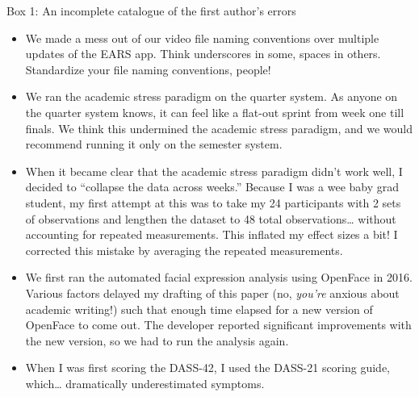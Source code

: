 \documentclass[authordate, empirical,issue]{jote-new-article}
\begin{document}
\begin{table}[b!]
  \begin{adjustwidth}{-4cm}{}
    \vspace*{.5\baselineskip}

    \begin{joteBox}{
        Box 1: An incomplete catalogue of the first author's errors%
      }

      \renewcommand{\baselinestretch}{1.5}
      \small
      \begin{itemize}



        \item    We made a mess out of our video file naming conventions over multiple updates of the EARS app. Think underscores in some, spaces in others. Standardize your file naming conventions, people!



        \item    We ran the academic stress paradigm on the quarter system. As anyone on the quarter system knows, it can feel like a flat-out sprint from week one till finals. We think this undermined the academic stress paradigm, and we would recommend running it only on the semester system.



        \item    When it became clear that the academic stress paradigm didn't work well, I decided to “collapse the data across weeks.” Because I was a wee baby grad student, my first attempt at this was to take my 24 participants with 2 sets of observations and lengthen the dataset to 48 total observations… without accounting for repeated measurements. This inflated my effect sizes a bit! I corrected this mistake by averaging the repeated measurements.



        \item    We first ran the automated facial expression analysis using OpenFace in 2016. Various factors delayed my drafting of this paper (no, \emph{you're} anxious about academic writing!) such that enough time elapsed for a new version of OpenFace to come out. The developer reported significant improvements with the new version, so we had to run the analysis again.



        \item    When I was first scoring the DASS-42, I used the DASS-21 scoring guide, which… dramatically underestimated symptoms.




      \end{itemize}


    \end{joteBox}

  \end{adjustwidth}

\end{table}
\end{document}
